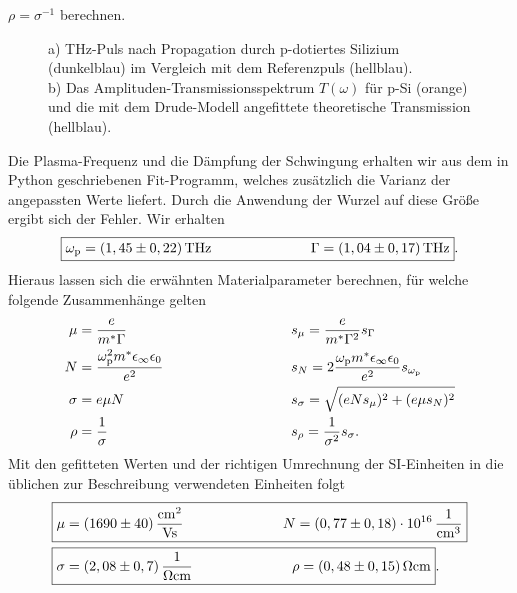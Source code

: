 $\rho = \sigma^{-1}$ berechnen.
\begin{figure}[h!]
    \centering
    \qquad
    \caption{\label{fig:pdot}a) THz-Puls nach Propagation durch p-dotiertes Silizium (dunkelblau) im Vergleich
    mit dem Referenzpuls (hellblau). \\
    b) Das Amplituden-Transmissionsspektrum $T(\omega)$ für p-Si (orange) und die mit dem 
    Drude-Modell angefittete theoretische Transmission (hellblau).}
\end{figure}\FloatBarrier
Die Plasma-Frequenz und die Dämpfung der Schwingung erhalten wir aus dem in Python geschriebenen 
Fit-Programm, welches zusätzlich die Varianz der angepassten Werte liefert. 
Durch die Anwendung der Wurzel auf diese Größe ergibt sich der Fehler. Wir erhalten
\begin{equation}
    \fbox{$\omega_{\text{p}} = (1,45\pm 0,22)\,\si{THz} \hspace{2.5cm} \Gamma = (1,04\pm 0,17)\,\si{THz}$}.
\end{equation}
Hieraus lassen sich die erwähnten Materialparameter berechnen, für welche 
folgende Zusammenhänge gelten \cite{Anleitung}
\begin{alignat*}{2}
    \mu &= \frac{e}{m^{*}\Gamma} \quad \hspace{2.5cm}
    &&s_{\mu} = \frac{e}{m^{*}\Gamma^{2}}s_{\Gamma} \\
    N &= \frac{\omega_{\text{p}}^{2}m^{*}\epsilon_{\infty}\epsilon_{0}}{e^{2}}  \quad\hspace{2.5cm}
    &&s_{N} = 2\frac{\omega_{\text{p}}m^{*}\epsilon_{\infty}\epsilon_{0}}{e^{2}}s_{\omega_{\text{p}}} \\
    \sigma &= e\mu N \quad\hspace{2.5cm}
    &&s_{\sigma} = \sqrt{(eNs_{\mu})^{2} + (e\mu s_{N})^{2}} \\
    \rho &= \frac{1}{\sigma} \quad \hspace{2.5cm}
    &&s_{\rho} = \frac{1}{\sigma^{2}}s_{\sigma}.
\end{alignat*}
Mit den gefitteten Werten und der richtigen Umrechnung der SI-Einheiten in die üblichen zur 
Beschreibung verwendeten Einheiten folgt
\begin{alignat}{2}
    \Aboxed{\mu &= (1690 \pm 40)\,\si{\frac{cm^{2}}{Vs}} \hspace{2.5cm} N = (0,77 \pm 0,18)\cdot 10^{16}\,\si{\frac{1}{cm^{3}}}} \\
    \Aboxed{\sigma &= (2,08 \pm 0,7)\,\si{\frac{1}{\ohm cm}} \hspace{2.5cm} \rho = (0,48 \pm 0,15)\,\si{\ohm cm}}.
\end{alignat}
